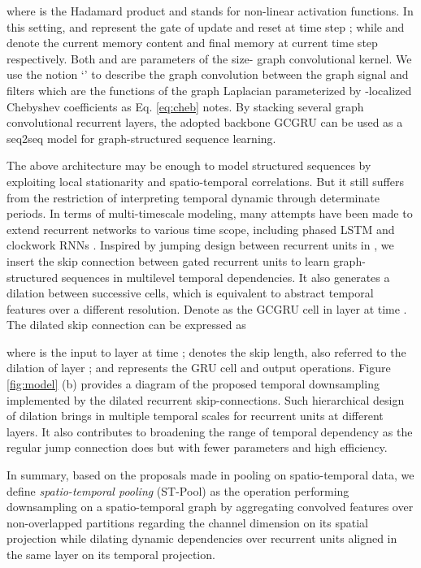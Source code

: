 \documentclass[sigconf,screen]{acmart}
\begin{document}
where  is the Hadamard product and  stands for non-linear activation functions. In this setting,  and  represent the gate of update and reset at time step ; while  and  denote the current memory content and final memory at current time step respectively. Both  and  are parameters of the size- graph convolutional kernel. We use the notion `' to describe the graph convolution between the graph signal  and  filters which are the functions of the graph Laplacian  parameterized by -localized Chebyshev coefficients as Eq. \eqref{eq:cheb} notes. By stacking several graph convolutional recurrent layers, the adopted backbone GCGRU can be used as a seq2seq model for graph-structured sequence learning.

The above architecture may be enough to model structured sequences by exploiting local stationarity and spatio-temporal correlations. But it still suffers from the restriction of interpreting temporal dynamic through determinate periods. In terms of multi-timescale modeling, many attempts have been made to extend recurrent networks to various time scope, including phased LSTM \cite{neil2016phased} and clockwork RNNs \cite{koutnik2014clockwork}. Inspired by jumping design between recurrent units in \cite{chang2017dilated}, we insert the skip connection between gated recurrent units to learn graph-structured sequences in multilevel temporal dependencies. It also generates a dilation between successive cells, which is equivalent to abstract temporal features over a different resolution. Denote  as the GCGRU cell in layer  at time . The dilated skip connection can be expressed as

where  is the input to layer  at time ;  denotes the skip length, also referred to the dilation of layer ; and  represents the GRU cell and output operations. Figure \ref{fig:model} (b) provides a diagram of the proposed temporal downsampling implemented by the dilated recurrent skip-connections. Such hierarchical design of dilation brings in multiple temporal scales for recurrent units at different layers. It also contributes to broadening the range of temporal dependency as the regular jump connection does but with fewer parameters and high efficiency.

In summary, based on the proposals made in pooling on spatio-temporal data, we define \emph{spatio-temporal pooling} (ST-Pool) as the operation performing downsampling on a spatio-temporal graph by aggregating convolved features over non-overlapped partitions regarding the channel dimension on its spatial projection while dilating dynamic dependencies over recurrent units aligned in the same layer on its temporal projection.
\end{document}
